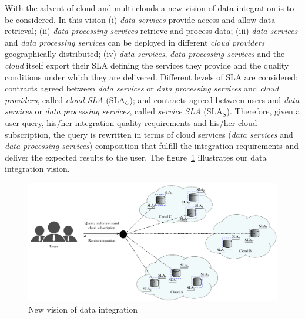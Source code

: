 With the advent of cloud and multi-clouds a new vision of data integration is to be considered.
In this vision 
(i) \textit{data services} provide access and allow data retrieval;  
(ii) \textit{data processing services} retrieve and process data; 
(iii) \textit{data services} and \textit{data processing services} can be deployed in different \textit{cloud providers} geographically distributed; 
(iv) \textit{data services}, \textit{data processing services} and the \textit{cloud} itself export their SLA defining the services they provide and the quality conditions under which they are delivered. Different levels of SLA are considered: contracts agreed between \textit{data services} or \textit{data processing services} and \textit{cloud providers}, called \textit{cloud SLA} (SLA$_{C}$); and contracts agreed between users and \textit{data services} or \textit{data processing services}, called \textit{service SLA} (SLA$_{S}$). 
Therefore, given a user query, his/her integration quality requirements and his/her cloud subscription, the query is rewritten in terms of cloud services (\textit{data services} and \textit{data processing services}) composition that fulfill the integration requirements and deliver the expected results to the user.
The figure~\ref{fig:scenario} illustrates our data integration vision.

\begin{figure}[h!]
\center
\includegraphics[scale=0.57]{scenario.pdf}
\caption{New vision of data integration}\label{fig:scenario}
\end{figure}

